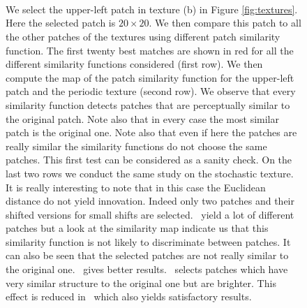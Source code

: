 \begin{figure}[H]
  \centering
   \hfill
   \hfill
   \hfill
   \hfill
   \hfill \\
   \hfill
   \hfill
   \hfill
   \hfill
   \hfill \\
   \hfill
   \hfill
   \hfill
   \hfill
   \hfill \\
   \hfill
   \hfill
   \hfill
   \hfill
   \hfill
  \caption{We select the upper-left patch in texture (b) in Figure \ref{fig:textures}. Here the selected patch is $20 \times 20$. We then compare this patch to all the other patches of the textures using different patch similarity function. The first twenty best matches are shown in red for all the different similarity functions considered (first row). We then compute the map of the patch similarity function for the upper-left patch and the periodic texture (second row). We observe that every similarity function detects patches that are perceptually similar to the original patch. Note also that in every case the most similar patch is the original one. Note also that even if here the patches are really similar the similarity functions do not choose the same patches. This first test can be considered as a sanity check. On the last two rows we conduct the same study on the stochastic texture. It is really interesting to note that in this case the Euclidean distance do not yield innovation. Indeed only two patches and their shifted versions for small shifts are selected.  \ yield a lot of different patches but a look at the similarity map indicate us that this similarity function is not likely to discriminate between patches. It can also be seen that the selected patches are not really similar to the original one. \s{\infty} \ gives better results. \sps \ selects patches which have very similar structure to the original one but are brighter. This effect is reduced in \scos \ which also yields satisfactory results.}
  \label{fig:sim_func1}
\end{figure}
